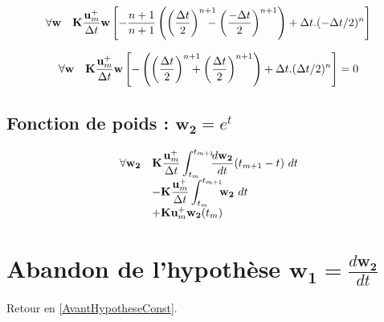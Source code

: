\documentclass[12pt,a4paper]{report}
\begin{document}
\begin{equation}
\begin{array}{r l l}
	\forall \mathbf{w}
	&\displaystyle
	 \mathbf{K} \frac{\mathbf{u}_m^+}{\Delta t} \mathbf{w}	 	
	 		\left[ \displaystyle
	 	 		- \frac{n+1}{n+1} \left(\left( \displaystyle\frac{\Delta t}{2} \right)^{n+1} 
	 	  		\!\!\!\!\!\!-\left(\displaystyle\frac{-\Delta t}{2}\right)^{n+1} \right)
	 	 + \Delta t .(-\Delta t/2)^n
	 	\right]
\end{array}
\end{equation}

\begin{equation}
\begin{array}{r l l}
	\forall \mathbf{w}
	&\displaystyle
	 \mathbf{K} \frac{\mathbf{u}_m^+}{\Delta t} \mathbf{w}	 	
	 		\left[ \displaystyle
	 	 		- \left(\left( \displaystyle\frac{\Delta t}{2} \right)^{n+1} 
	 	  		\!\!\!\!\!\!+\left(\displaystyle\frac{\Delta t}{2}\right)^{n+1} \right)
	 	 + \Delta t .(\Delta t/2)^n
	 	\right] = 0
\end{array}
\end{equation}

\subsection{Fonction de poids : $\mathbf{w_2} = e^t$}

\begin{equation}
\begin{array}{r l}
	\forall \mathbf{w_2}
	&\displaystyle
	 \mathbf{K} \frac{\mathbf{u}_m^+}{\Delta t} 
	 	\int_{t_m}^{t_{m+1}} \!\!\! \frac{d\mathbf{w_2}}{dt}		
			(t_{m+1}-t) ~dt
	\\
	  &\displaystyle	
	   - \mathbf{K} \frac{ \mathbf{u}_m^+ }{\Delta t}
	   		\int_{t_m}^{t_{m+1}} \!\!\!  \mathbf{w_2} 	~dt 
	\\
	  &+ \mathbf{K} \mathbf{u}_m^+  \mathbf{w_2}(t_m)
\end{array}
\end{equation}

\section{Abandon de l'hypothèse $\displaystyle \mathbf{w_1} = \frac{d\mathbf{w_2}}{dt}$}

Retour en \ref{AvantHypotheseConst}.
\end{document}
